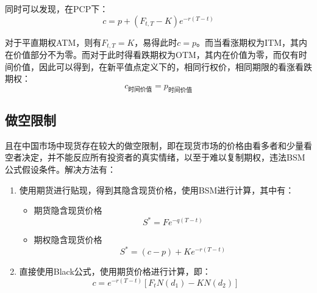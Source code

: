 \documentclass[11pt]{article}
\begin{document}
同时可以发现，在PCP下：
\begin{equation*}
    c = p + (F_{t,T}-K) e^{-r(T-t)}
\end{equation*}

对于平直期权ATM，则有$F_{t,T}=K$，易得此时$c=p$。而当看涨期权为ITM，其内在价值部分不为零。而对于此时得看跌期权为OTM，其内在价值为零，而仅有时间价值，因此可以得到，在新平值点定义下的，相同行权价，相同期限的看涨看跌期权：
\begin{equation*}
    c_{\text{时间价值}} = p_{\text{时间价值}}
\end{equation*}

\subsection{做空限制}

且在中国市场中现货存在较大的做空限制，即在现货市场的价格由看多者和少量看空者决定，并不能反应所有投资者的真实情绪，以至于难以复制期权，违法BSM公式假设条件。解决方法有：
\begin{enumerate}
    \setlength{\itemsep}{0em}
    \item 使用期货进行贴现，得到其隐含现货价格，使用BSM进行计算，其中有：
    \begin{itemize}
        \item 期货隐含现货价格
        \begin{equation*}
            S^* = F e^{-q(T-t)}
        \end{equation*}
        \item 期权隐含现货价格
        \begin{equation*}
            S^* = (c-p) + Ke^{-r(T-t)}
        \end{equation*}
    \end{itemize}
    \item 直接使用Black公式，使用期货价格进行计算，即：
    \begin{equation*}
        c = e^{-r(T-t)} \left[ F_t N(d_1)-K N(d_2) \right]
    \end{equation*}
\end{enumerate}
\end{document}
